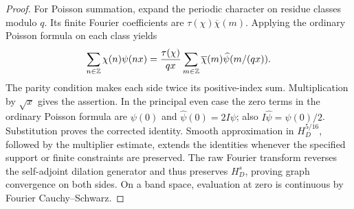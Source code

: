 \begin{proof}
For Poisson summation, expand the periodic character on residue
classes modulo $q$. Its finite Fourier coefficients are
$\tau(\chi)\overline\chi(m)$. Applying the ordinary Poisson formula
on each class yields
\[
 \sum_{n\in\mathbb Z}\chi(n)\psi(nx)=
    \frac{\tau(\chi)}{qx}\sum_{m\in\mathbb Z}
                \overline\chi(m)\widehat\psi(m/(qx)).
\]
The parity condition makes each side twice its positive-index sum.
Multiplication by $\sqrt x$ gives the assertion.
In the principal even case the zero terms in the ordinary Poisson
formula are $\psi(0)$ and $\widehat\psi(0)=2I\psi$;
also $I\widehat\psi=\psi(0)/2$. Substitution proves the corrected
identity. Smooth approximation in $H_D^{5/16}$, followed by the
multiplier estimate, extends the identities whenever the specified
support or finite constraints are preserved. The raw Fourier
transform reverses the self-adjoint dilation generator and thus
preserves $H_D^s$, proving graph convergence on both sides. On a band space,
evaluation at zero is continuous by Fourier Cauchy--Schwarz.
\end{proof}

